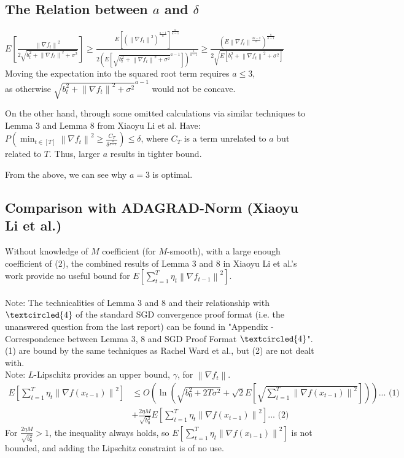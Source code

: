 \documentclass[14pt,onecolumn,letterpaper]{extarticle}
\begin{document}
\subsection{The Relation between $a$ and $\delta$}
$E\left[\frac{\left\|\nabla f_t\right\|^2}{2 \sqrt{b_t^2+\left\|\nabla f_t\right\|^2+\sigma^2}}\right] \geq \frac{E\left[\left(\left\|\nabla f_t\right\|^2\right)^{\frac{a-1}{a}}\right]^{\frac{a}{a-1}}}{2
\left(E\left[\sqrt{b_t^2+\left\|\nabla f_t\right\|^2+\sigma^2}^{a-1}\right]\right)^{\frac{1}{a-1}}} \geq \frac{\left(E\left\|\nabla f_t\right\|^{\frac{2a-2}{a}}\right)^{\frac{a}{a-1}}}{2 \sqrt{E\left[b_t^2+\left\|\nabla f_t\right\|^2+\sigma^2\right]}}$
\\Moving the expectation into the squared root term requires $a\leq3$, \\
as otherwise $\sqrt{b_t^2+\left\|\nabla f_t\right\|^2+\sigma^2}^{a-1}$ would not be concave.\par
On the other hand, through some omitted calculations via similar techniques to Lemma 3 and Lemma 8 from Xiaoyu Li et al. Have:
$P\left(\min _{t \in[T]}\left\|\nabla f_t\right\|^2 \geq \frac{C_T}{\delta^{\frac{a}{a-1}}}\right)\leq \delta$, where $C_T$ is a term unrelated to $a$ but related to $T$. Thus, larger $a$ results in tighter bound. \par
From the above, we can see why $a = 3$ is optimal.
\subsection{Comparison with ADAGRAD-Norm (Xiaoyu Li et al.)}
Without knowledge of $M$ coefficient (for $M$-smooth), with a large enough coefficient of (2), the combined results of Lemma 3 and 8 in Xiaoyu Li et al.'s work provide no useful bound for $E\left[\sum_{t=1}^T \eta_t\left\|\nabla f_{t-1}\right\|^2\right]$.\\ 
    \\Note: The technicalities of Lemma 3 and 8 and their relationship with $\textcircled{4}$ of the standard SGD convergence proof format (i.e. the unanswered question from the last report) can be found in "Appendix - Correspondence between Lemma 3, 8 and SGD Proof Format $\textcircled{4}$".
(1) are bound by the same techniques as Rachel Ward et al., but (2) are not dealt with. \\Note: $L$-Lipschitz provides an upper bound, $\gamma$, for $\left\|\nabla f_t\right\|$. 
\\
$\begin{aligned}  E\left[\sum_{t=1}^T \eta_t\left\|\nabla f\left(x_{t-1}\right)\right\|^2\right] &\leq O\left( \ln \left(\sqrt{b_0^2+2 T \sigma^2}+\sqrt{2} E\left[\sqrt{\sum_{t=1}^T \left\|\nabla f\left(x_{t-1}\right)\right\|^2}\right]\right)\right)\text{... (1)} \\ 
& +\frac{2 \eta M}{\sqrt{b_0^2}} E\left[\sum_{t=1}^T \eta_t\left\|\nabla f\left(x_{t-1}\right)\right\|^2\right]\text{... (2)}\end{aligned}$
\\For $\frac{2 \eta M}{\sqrt{b_0^2}} > 1$, the inequality always holds, so $E\left[\sum_{t=1}^T \eta_t\left\|\nabla f\left(x_{t-1}\right)\right\|^2\right]$ is not bounded, and adding the Lipschitz constraint is of no use.
\end{document}
